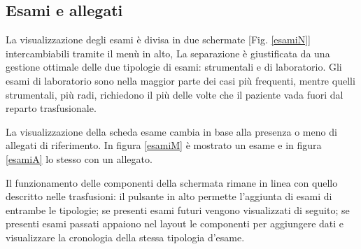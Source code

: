 \documentclass[12pt,a4paper,openright,twoside]{report}
\begin{document}

\subsection{Esami e allegati}
La visualizzazione degli esami è divisa in due schermate [Fig. \ref{esamiN}] intercambiabili tramite il menù in alto, La separazione è giustificata da una gestione ottimale delle due tipologie di esami: strumentali e di laboratorio. Gli esami di laboratorio sono nella maggior parte dei casi più frequenti, mentre quelli strumentali, più radi, richiedono il più delle volte che il paziente vada fuori dal reparto trasfusionale. 

La visualizzazione della scheda esame cambia in base alla presenza o meno di allegati di riferimento. In figura \ref{esamiM} è mostrato un esame e in figura \ref{esamiA} lo stesso con un allegato.

Il funzionamento delle componenti della schermata rimane in linea con quello descritto nelle trasfusioni: il pulsante in alto permette l'aggiunta di esami di entrambe le tipologie; se presenti esami futuri vengono visualizzati di seguito; se presenti esami passati appaiono nel layout le componenti per aggiungere dati e visualizzare la cronologia della stessa tipologia d'esame.

\end{document}
